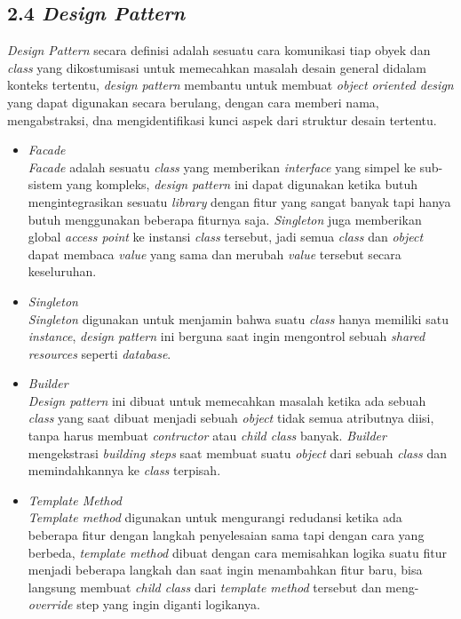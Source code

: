 \documentclass[a4paper]{article}
\begin{document}
\subsection*{2.4 \textit{Design Pattern}}

\textit{Design Pattern} secara definisi adalah sesuatu cara komunikasi tiap obyek dan \textit{class} yang dikostumisasi untuk memecahkan masalah desain general didalam konteks tertentu, \textit{design pattern} membantu untuk membuat \textit{object oriented design} yang dapat digunakan secara berulang, dengan cara memberi nama, mengabstraksi, dna mengidentifikasi kunci aspek dari struktur desain tertentu\autocite{design-pattern-2588942}.
\begin{itemize}
    \item \textit{Facade}\\
          \textit{Facade} adalah sesuatu \textit{class} yang memberikan \textit{interface} yang simpel ke sub-sistem yang kompleks, \textit{design pattern} ini dapat digunakan ketika butuh mengintegrasikan sesuatu \textit{library} dengan fitur yang sangat banyak tapi hanya butuh menggunakan beberapa fiturnya saja\autocite{refactoring-guru}. \textit{Singleton} juga memberikan global \textit{access point} ke instansi \textit{class} tersebut, jadi semua \textit{class} dan \textit{object} dapat membaca \textit{value} yang sama dan merubah \textit{value} tersebut secara keseluruhan\autocite{refactoring-guru}.
    \item \textit{Singleton}\\
          \textit{Singleton} digunakan untuk menjamin bahwa suatu \textit{class} hanya memiliki satu \textit{instance}, \textit{design pattern} ini berguna saat ingin mengontrol sebuah \textit{shared resources} seperti \textit{database}\autocite{refactoring-guru}.
    \item \textit{Builder}\\
          \textit{Design pattern} ini dibuat untuk memecahkan masalah ketika ada sebuah \textit{class} yang saat dibuat menjadi sebuah \textit{object} tidak semua atributnya diisi, tanpa harus membuat \textit{contructor} atau \textit{child class} banyak. \textit{Builder} mengekstrasi \textit{building steps} saat membuat suatu \textit{object} dari sebuah \textit{class} dan memindahkannya ke \textit{class} terpisah\autocite{refactoring-guru}.
    \item \textit{Template Method}\\
          \textit{Template method} digunakan untuk mengurangi redudansi ketika ada beberapa fitur dengan langkah penyelesaian sama tapi dengan cara yang berbeda, \textit{template method} dibuat dengan cara memisahkan logika suatu fitur menjadi beberapa langkah dan saat ingin menambahkan fitur baru, bisa langsung membuat \textit{child class} dari \textit{template method} tersebut dan meng-\textit{override} step yang ingin diganti logikanya\autocite{refactoring-guru}.
\end{itemize}
\end{document}
